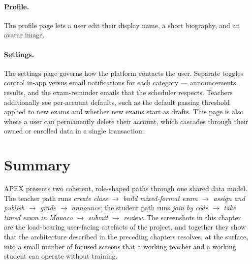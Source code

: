 \paragraph{Profile.} The profile page lets a user edit their display name, a
short biography, and an avatar image.

\paragraph{Settings.} The settings page governs how the platform contacts the
user. Separate toggles control in-app versus email notifications for each
category — announcements, results, and the exam-reminder emails that the
scheduler respects. Teachers additionally see per-account defaults, such as the
default passing threshold applied to new exams and whether new exams start as
drafts. This page is also where a user can permanently delete their account,
which cascades through their owned or enrolled data in a single transaction.

\section{Summary}

APEX presents two coherent, role-shaped paths through one shared data model. The
teacher path runs \emph{create class $\rightarrow$ build mixed-format exam
$\rightarrow$ assign and publish $\rightarrow$ grade $\rightarrow$ announce}; the
student path runs \emph{join by code $\rightarrow$ take timed exam in Monaco
$\rightarrow$ submit $\rightarrow$ review}. The screenshots in this chapter are
the load-bearing user-facing artefacts of the project, and together they show
that the architecture described in the preceding chapters resolves, at the
surface, into a small number of focused screens that a working teacher and a
working student can operate without training.
